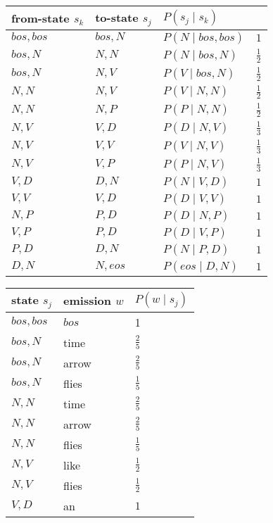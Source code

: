 \documentclass[11pt]{article}
\begin{document}
\begin{exe}
\begin{xlist}
{\begin{soln}
\begin{tabular}{|l|l|ll|}
\hline
from-state $s_k$ & to-state $s_j$ & $P(s_j \mid s_k)$ & \\
\hline
 $bos,bos$ & $bos,N$ & $P(N \mid bos,bos)$& $1$ \\ \hline
 $bos,N$   & $N,N$   & $P(N \mid bos,N)$& $\frac{1}{2}$ \\
 $bos,N$   & $N,V$   & $P(V \mid bos,N)$& $\frac{1}{2}$ \\ \hline
 $N,N$     & $N,V$   & $P(V \mid N,N)$ & $\frac{1}{2}$ \\
 $N,N$     & $N,P$   & $P(P \mid N,N) $& $\frac{1}{2}$ \\ \hline
 $N,V$     & $V,D$   & $P(D \mid N,V)$ & $\frac{1}{3}$ \\
 $N,V$     & $V,V$   & $P(V \mid N,V) $& $\frac{1}{3}$ \\
 $N,V$     & $V,P$   & $P(P \mid N,V) $& $\frac{1}{3}$ \\ \hline
 $V,D$     & $D,N$   & $P(N \mid V,D)$& $1$ \\ \hline 
 $V,V$     & $V,D$   & $P(D \mid V,V)$& $1$ \\ \hline 
 $N,P$     & $P,D$   & $P(D \mid N,P)$& $1$ \\ \hline 
 $V,P$     & $P,D$   & $P(D \mid V,P)$& $1$ \\ \hline 
 $P,D$     & $D,N$   & $P(N \mid P,D)$& $1$ \\ \hline 
 $D,N$     & $N,eos$ & $P(eos \mid D,N)$& $1$ \\
 \hline
\end{tabular}
\hspace{.5in}
\begin{tabular}{|l|l|l|}
\hline
state $s_j$ & emission $w$ & $P(w \mid s_j)$ \\
\hline
 $bos,bos$ & $bos$ & 1 \\ \hline
 $bos,N$   & time & $\frac{2}{5}$ \\
 $bos,N$     & arrow & $\frac{2}{5}$ \\
 $bos,N$     & flies & $\frac{1}{5}$ \\ \hline
 $N,N$     & time & $\frac{2}{5}$ \\
 $N,N$     & arrow & $\frac{2}{5}$ \\
 $N,N$     & flies & $\frac{1}{5}$ \\ \hline
 $N,V$     & like & $\frac{1}{2}$ \\
 $N,V$     & flies & $\frac{1}{2}$ \\ \hline
 $V,D$     & an & $1$ \\ \hline

\end{tabular}
\end{soln}}
\end{xlist}
\end{exe}
\end{document}
